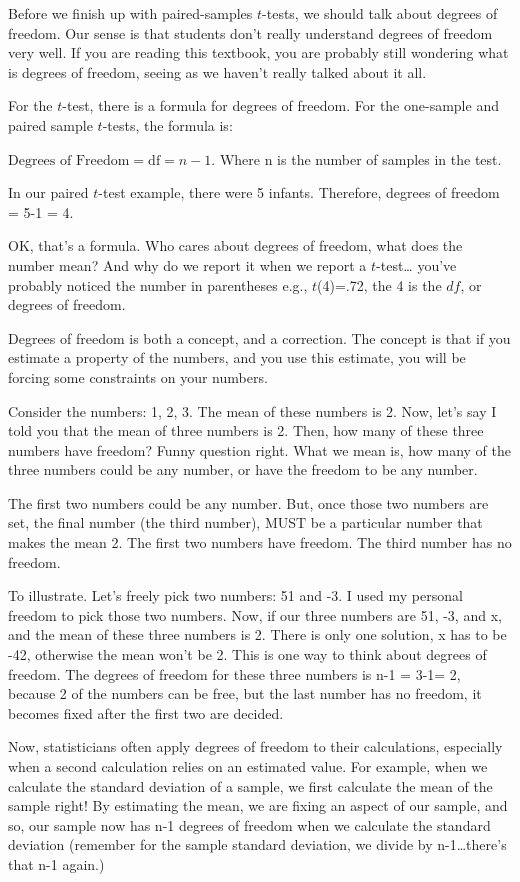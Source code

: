 \documentclass[
]{book}
\begin{document}
Before we finish up with paired-samples \(t\)-tests, we should talk about degrees of freedom. Our sense is that students don't really understand degrees of freedom very well. If you are reading this textbook, you are probably still wondering what is degrees of freedom, seeing as we haven't really talked about it all.

For the \(t\)-test, there is a formula for degrees of freedom. For the one-sample and paired sample \(t\)-tests, the formula is:

\(\text{Degrees of Freedom} = \text{df} = n-1\). Where n is the number of samples in the test.

In our paired \(t\)-test example, there were 5 infants. Therefore, degrees of freedom = 5-1 = 4.

OK, that's a formula. Who cares about degrees of freedom, what does the number mean? And why do we report it when we report a \(t\)-test\ldots{} you've probably noticed the number in parentheses e.g., \(t\)(4)=.72, the 4 is the \(df\), or degrees of freedom.

Degrees of freedom is both a concept, and a correction. The concept is that if you estimate a property of the numbers, and you use this estimate, you will be forcing some constraints on your numbers.

Consider the numbers: 1, 2, 3. The mean of these numbers is 2. Now, let's say I told you that the mean of three numbers is 2. Then, how many of these three numbers have freedom? Funny question right. What we mean is, how many of the three numbers could be any number, or have the freedom to be any number.

The first two numbers could be any number. But, once those two numbers are set, the final number (the third number), MUST be a particular number that makes the mean 2. The first two numbers have freedom. The third number has no freedom.

To illustrate. Let's freely pick two numbers: 51 and -3. I used my personal freedom to pick those two numbers. Now, if our three numbers are 51, -3, and x, and the mean of these three numbers is 2. There is only one solution, x has to be -42, otherwise the mean won't be 2. This is one way to think about degrees of freedom. The degrees of freedom for these three numbers is n-1 = 3-1= 2, because 2 of the numbers can be free, but the last number has no freedom, it becomes fixed after the first two are decided.

Now, statisticians often apply degrees of freedom to their calculations, especially when a second calculation relies on an estimated value. For example, when we calculate the standard deviation of a sample, we first calculate the mean of the sample right! By estimating the mean, we are fixing an aspect of our sample, and so, our sample now has n-1 degrees of freedom when we calculate the standard deviation (remember for the sample standard deviation, we divide by n-1\ldots there's that n-1 again.)
\end{document}
